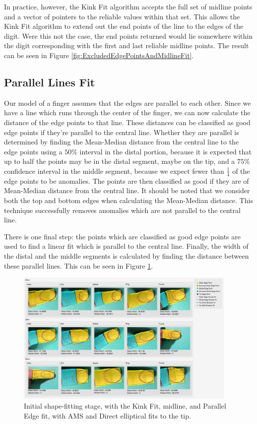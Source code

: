 In practice, however, the Kink Fit algorithm accepts the full set of midline points and a vector of pointers to the reliable values within that set. This allows the Kink Fit algorithm to extend out the end points of the line to the edges of the digit. Were this not the case, the end points returned would lie somewhere within the digit corresponding with the first and last reliable midline points. The result can be seen in Figure \ref{fig:ExcludedEdgePointsAndMidlineFit}.

\subsection{Parallel Lines Fit}\label{sec:ParallelLinesFit}
Our model of a finger assumes that the edges are parallel to each other. Since we have a line which runs through the center of the finger, we can now calculate the distance of the edge points to that line. These distances can be classified as good edge points if they're parallel to the central line. Whether they are parallel is determined by finding the Mean-Median distance from the central line to the edge points using a $50\%$ interval in the distal portion, because it is expected that up to half the points may be in the distal segment, maybe on the tip, and a $75\%$ confidence interval in the middle segment, because we expect fewer than $\frac{1}{4}$ of the edge points to be anomalies. The points are then classified as good if they are of Mean-Median distance from the central line. It should be noted that we consider both the top and bottom edges when calculating the Mean-Median distance. This technique successfully removes anomalies which are not parallel to the central line.

There is one final step: the points which are classified as good edge points are used to find a linear fit which is parallel to the central line. Finally, the width of the distal and the middle segments is calculated by finding the distance between these parallel lines. This can be seen in Figure \ref{fig:ParallelFit}.

\begin{figure}[h!]
  \centering
    \includegraphics[width=0.95\textwidth]{Chapter4/Figs/ParallelFit.jpg}
    \caption{Initial shape-fitting stage, with the Kink Fit, midline, and Parallel Edge fit, with AMS and Direct elliptical fits to the tip.}\label{fig:ParallelFit}
\end{figure}

